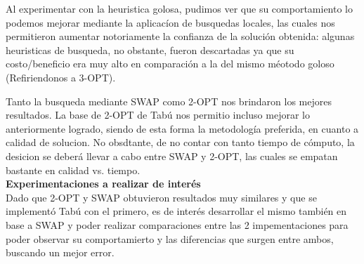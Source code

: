 Al experimentar con la heuristica golosa, pudimos ver que su comportamiento lo podemos mejorar mediante la aplicacíon de busquedas locales, las cuales nos permitieron aumentar notoriamente la confianza de la solución obtenida: algunas heuristicas de busqueda, no obstante, fueron descartadas ya que  su costo/beneficio era muy alto en comparación a la del mismo méotodo goloso (Refiriendonos a 3-OPT). 

Tanto la busqueda mediante SWAP como 2-OPT nos brindaron los mejores resultados. La base de 2-OPT de Tabú nos permitio incluso mejorar lo anteriormente logrado, siendo de esta forma la metodología preferida, en cuanto a calidad de solucion. No obsdtante, de no contar con tanto tiempo de cómputo, la desicion se deberá llevar a cabo entre SWAP y 2-OPT, las cuales se empatan bastante en calidad vs. tiempo.\\

\textbf{Experimentaciones a realizar de interés}\\
Dado que 2-OPT y SWAP obtuvieron resultados muy similares y que se implementó Tabú con el primero, es de interés desarrollar el mismo también en base a SWAP y poder realizar comparaciones entre las 2 impementaciones para poder observar su comportamierto y las diferencias que surgen entre ambos, buscando un mejor error.

